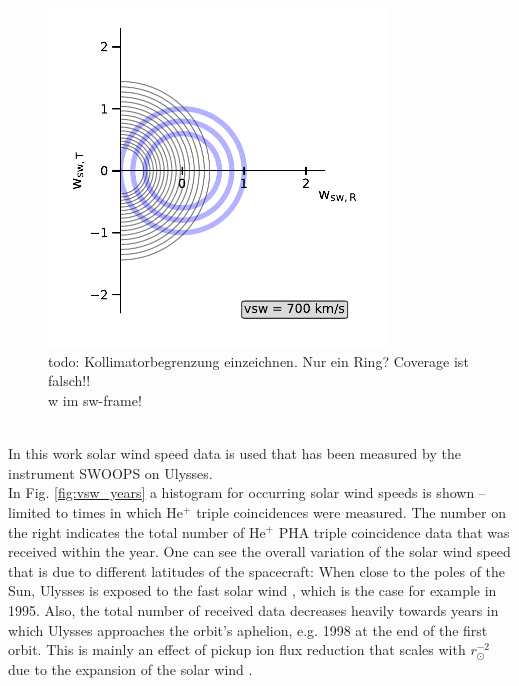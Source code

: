 \begin{figure}[h]
	\includegraphics[width=0.8\textwidth]{Figures/cov.pdf}
	\centering
	\caption{todo: Kollimatorbegrenzung einzeichnen. Nur ein Ring? Coverage ist falsch!!\\
	w im sw-frame!}
	\label{fig:cov}
\end{figure}
\\
In this work solar wind speed data is used that has been measured by the instrument SWOOPS \citep[Solar Wind Observations Over the Poles of the Sun,][]{bame_swoops} on Ulysses. \\ 
In Fig. \ref{fig:vsw_years} a histogram for occurring solar wind speeds is shown -- limited to times in which $\mathrm{He^{+}}$ triple coincidences were measured.  The number on the right indicates the total number of $\mathrm{He^{+}}$ PHA triple coincidence data that was received within the year. One can see the overall variation of the solar wind speed that is due to different latitudes of the spacecraft: When close to the poles of the Sun, Ulysses is exposed to the fast solar wind \citep{mccomas_2004}, which is the case for example in 1995. Also, the total number of received data decreases heavily towards years in which Ulysses approaches the orbit's aphelion, e.g. 1998 at the end of the first orbit. This is mainly an effect of pickup ion flux reduction that scales with $r_\odot^{-2}$ due to the expansion of the solar wind \citep[][,ch. 6.1]{prlss_2004}.
